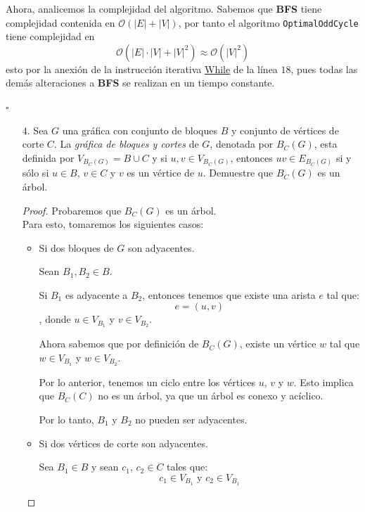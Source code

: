 \documentclass{article}
\newcommand{\code}[1]{\textcolor{white!25!black}{\texttt{#1}}}
\begin{document}
  Ahora, analicemos la complejidad del algoritmo. Sabemos que \textbf{BFS}
  tiene complejidad contenida en $\mathcal{O}(|E| + |V|)$, por tanto el
  algoritmo \code{OptimalOddCycle} tiene complejidad en
  \[
  \mathcal{O}(|E|\cdot|V| + |V|^2) \approx \mathcal{O}(|V|^2)
  \]
  esto por la anexi\'on de la instrucci\'on iterativa \underline{While} de
  la l\'inea $18$, pues todas las dem\'as alteraciones a \textbf{BFS} se
  realizan en un tiempo constante.

  \hfill $\square$

  \begin{enumerate}
    \item[$4$.] Sea $G$ una gr\'afica con conjunto de bloques $B$ y conjunto de
      v\'ertices de corte $C$.   La {\em gr\'afica de bloques y cortes} de $G$,
      denotada por $B_C (G)$, esta definida por $V_{B_C (G)} = B \cup C$ y
      si $u, v \in V_{B_C (G)}$, entonces $uv \in E_{B_C (G)}$ si y s\'olo si
      $u \in B$, $v \in C$ y $v$ es un v\'ertice de $u$.   Demuestre que
      $B_C (G)$ es un \'arbol.

      \begin{proof}
        Probaremos que $B_{C}(G)$ es un árbol. \\
        Para esto, tomaremos los siguientes casos:
        \begin{itemize}
          \item Si dos bloques de $G$ son adyacentes.

            Sean $B_{1}, B_{2} \in B$.

            Si $B_{1}$ es adyacente a $B_{2}$, entonces tenemos que existe una arista $e$ tal que:
            $$e = (u, v)$$
            , donde $u \in V_{B_{1}}$ y $v \in V_{B_{2}}$.

            Ahora sabemos que por definición de $B_{C}(G)$, existe un vértice $w$ tal que $w \in V_{B_{1}}$ y $w \in V_{B_{2}}$.

            Por lo anterior, tenemos un ciclo entre los vértices $u$, $v$ y $w$. Esto implica que $B_{C}(C)$ no es un árbol, ya que un árbol es conexo y acíclico.

            Por lo tanto, $B_{1}$ y $B_{2}$ no pueden ser adyacentes. \\

          \item Si dos vértices de corte son adyacentes.

            Sea $B_{1} \in B$ y sean $c_{1}$, $c_{2} \in C$ tales que:
            $$c_{1} \in V_{B_{1}} \text{ y } c_{2} \in V_{B_{1}}$$


\end{itemize}
\end{proof}
\end{enumerate}
\end{document}
